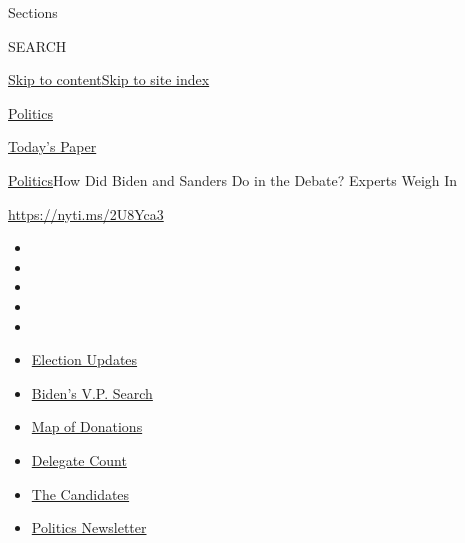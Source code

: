 Sections

SEARCH

\protect\hyperlink{site-content}{Skip to
content}\protect\hyperlink{site-index}{Skip to site index}

\href{https://www.nytimes.com/section/politics}{Politics}

\href{https://myaccount.nytimes.com/auth/login?response_type=cookie\&client_id=vi}{}

\href{https://www.nytimes.com/section/todayspaper}{Today's Paper}

\href{/section/politics}{Politics}\textbar{}How Did Biden and Sanders Do
in the Debate? Experts Weigh In

\url{https://nyti.ms/2U8Yca3}

\begin{itemize}
\item
\item
\item
\item
\item
\end{itemize}

\begin{itemize}
\item
  \href{https://www.nytimes.com/2020/07/31/us/elections/biden-vs-trump.html?action=click\&pgtype=Article\&state=default\&region=TOP_BANNER\&context=storylines_menu}{Election
  Updates}
\item
  \href{https://www.nytimes.com/article/biden-vice-president-2020.html?action=click\&pgtype=Article\&state=default\&region=TOP_BANNER\&context=storylines_menu}{Biden's
  V.P. Search}
\item
  \href{https://www.nytimes.com/interactive/2020/07/24/us/politics/trump-biden-campaign-donors.html?action=click\&pgtype=Article\&state=default\&region=TOP_BANNER\&context=storylines_menu}{Map
  of Donations}
\item
  \href{https://www.nytimes.com/interactive/2020/us/elections/delegate-count-primary-results.html?action=click\&pgtype=Article\&state=default\&region=TOP_BANNER\&context=storylines_menu}{Delegate
  Count}
\item
  \href{https://www.nytimes.com/interactive/2019/us/politics/2020-presidential-candidates.html?action=click\&pgtype=Article\&state=default\&region=TOP_BANNER\&context=storylines_menu}{The
  Candidates}
\item
  \href{https://www.nytimes.com/newsletters/politics?action=click\&pgtype=Article\&state=default\&region=TOP_BANNER\&context=storylines_menu}{Politics
  Newsletter}
\end{itemize}

